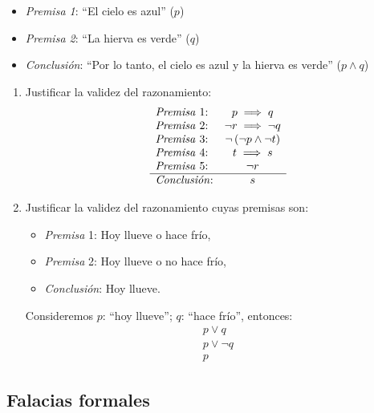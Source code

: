 \begin{enumerate}[label=\alph*)]
	\begin{fmd-example}[Adjunción]
		\begin{itemize}
			\item \textit{Premisa 1}: ``El cielo es azul'' ($p$)
			\item \textit{Premisa 2}: ``La hierva es verde'' ($q$)
			\item \textit{Conclusión}: ``Por lo tanto, el cielo es azul y la hierva es verde'' ($p \land q$)
		\end{itemize}
	\end{fmd-example}
\end{enumerate}

\begin{fmd-example}
	\begin{enumerate}
		\item Justificar la validez del razonamiento:
		\[
		\begin{array}{lc}
			\mbox{\textit{Premisa} 1:} & p \implies q\\
			\mbox{\textit{Premisa} 2:} & \neg r \implies \neg q \\
			\mbox{\textit{Premisa} 3:} & \neg \left( \neg p \land \neg t \right) \\
			\mbox{\textit{Premisa} 4:} & t \implies s \\
			\mbox{\textit{Premisa} 5:} & \neg r \\ \hline
			\mbox{\textit{Conclusión}:} & s
		\end{array}
		\]
		\item Justificar la validez del razonamiento cuyas premisas son:
		\begin{itemize}
			\item \textit{Premisa} 1: Hoy llueve o hace frío,
			\item \textit{Premisa} 2: Hoy llueve o no hace frío,
			\item \textit{Conclusión}: Hoy llueve.
		\end{itemize}
		
		Consideremos $p$: ``hoy llueve''; $q$: ``hace frío'', entonces:
		\[ 
		\begin{array}{l}
			p \lor q\\
			p \lor \neg q \\ \hline
			p
		\end{array}
		\]
	\end{enumerate}
\end{fmd-example}

\subsection{Falacias formales}

